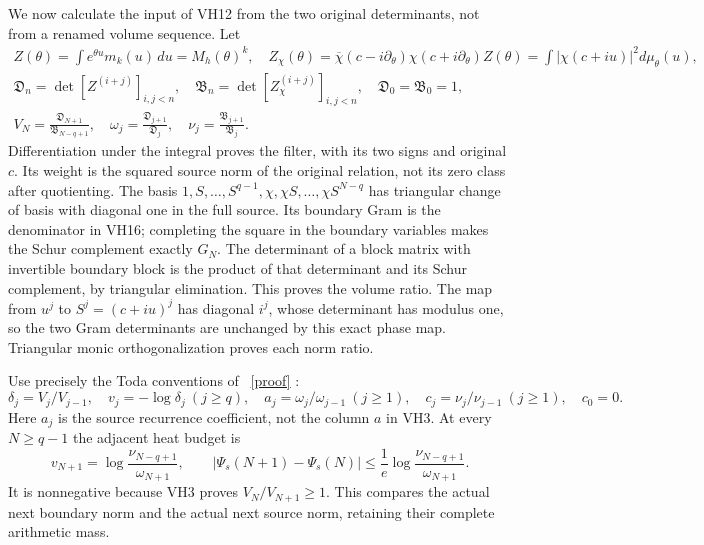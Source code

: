 \documentclass[11pt]{article}
\begin{document}
We now calculate the input of VH12 from the two original determinants,
not from a renamed volume sequence. Let
\begin{equation}\tag{VH16}\label{VH16}
\begin{gathered}
Z(\theta)=\int e^{\theta u}m_k(u)\,du=M_h(\theta)^k,\quad
Z_\chi(\theta)=\overline\chi(c-i\partial_\theta)
\chi(c+i\partial_\theta)Z(\theta)
=\int|\chi(c+iu)|^2d\mu_\theta(u),\\
\mathfrak D_n=\det[Z^{(i+j)}]_{i,j<n},\quad
\mathfrak B_n=\det[Z_\chi^{(i+j)}]_{i,j<n},\quad
\mathfrak D_0=\mathfrak B_0=1,\\
V_N=\frac{\mathfrak D_{N+1}}{\mathfrak B_{N-q+1}},\quad
\omega_j=\frac{\mathfrak D_{j+1}}{\mathfrak D_j},\quad
\nu_j=\frac{\mathfrak B_{j+1}}{\mathfrak B_j}.
\end{gathered}
\end{equation}
Differentiation under the integral proves the filter, with its two
signs and original \(c\). Its weight is the squared source norm of
the original relation, not its zero class after quotienting.
The basis \(1,S,\ldots,S^{q-1},\chi,\chi S,\ldots,\chi S^{N-q}\)
has triangular change of basis with diagonal one in the full source.
Its boundary Gram is the denominator in VH16; completing the square
in the boundary variables makes the Schur complement exactly \(G_N\).
The determinant of a block matrix with invertible boundary block is
the product of that determinant and its Schur complement, by triangular
elimination. This proves the volume ratio. The map from \(u^j\) to
\(S^j=(c+iu)^j\) has diagonal \(i^j\), whose determinant has modulus
one, so the two Gram determinants are unchanged by this exact phase
map. Triangular monic orthogonalization proves each norm ratio.

Use precisely the Toda conventions of \cite[(19), (25)--(26)]{TV}%
~\href{https://github.com/KokunoYumeto/zeta-function-research-reader/blob/5992ad50c0f2a06921f1fcaded7b4e38097c0739/workbenches/splitzero-tandem/continuations/20260920-original-kernel-mixed-determinants/providers/TODA_VOLUME_CONTROL.tex\#L1}{[proof]}%
{}:
\begin{equation}\tag{VH17}\label{VH17}
\delta_j=V_j/V_{j-1},\quad v_j=-\log\delta_j\ (j\ge q),\quad
a_j=\omega_j/\omega_{j-1}\ (j\ge1),\quad
c_j=\nu_j/\nu_{j-1}\ (j\ge1),\quad c_0=0.
\end{equation}
Here \(a_j\) is the source recurrence coefficient, not the column
\(a\) in VH3. At every \(N\ge q-1\) the adjacent heat budget is
\begin{equation}\tag{VH18}\label{VH18}
v_{N+1}=\log\frac{\nu_{N-q+1}}{\omega_{N+1}},\qquad
|\Psi_s(N+1)-\Psi_s(N)|\le
\frac1e\log\frac{\nu_{N-q+1}}{\omega_{N+1}}.
\end{equation}
It is nonnegative because VH3 proves \(V_N/V_{N+1}\ge1\).
This compares the actual next boundary norm and the actual next
source norm, retaining their complete arithmetic mass.
\end{document}
